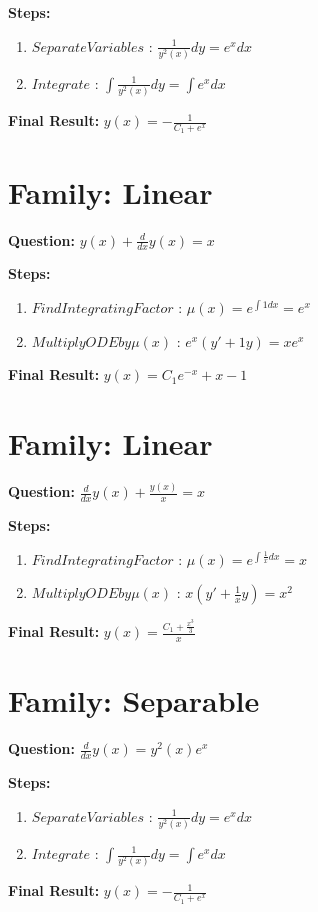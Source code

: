 \documentclass{article}
\begin{document}
\textbf{Steps:}
\begin{enumerate}
\item $Separate Variables$ :  $\frac{1}{y^{2}{\left(x \right)}} dy = e^{x} dx$
\item $Integrate$ :  $\int \frac{1}{y^{2}{\left(x \right)}} dy = \int e^{x} dx$
\end{enumerate}
\textbf{Final Result:} $y{\left(x \right)} = - \frac{1}{C_{1} + e^{x}}$

\section*{Family: Linear}
\textbf{Question:} $y{\left(x \right)} + \frac{d}{d x} y{\left(x \right)} = x$

\textbf{Steps:}
\begin{enumerate}
\item $Find Integrating Factor$ :  $\mu(x) = e^{\int 1 dx} = e^{x}$
\item $Multiply ODE by \mu(x)$ :  $e^{x}(y' + 1y) = x e^{x}$
\end{enumerate}
\textbf{Final Result:} $y{\left(x \right)} = C_{1} e^{- x} + x - 1$

\section*{Family: Linear}
\textbf{Question:} $\frac{d}{d x} y{\left(x \right)} + \frac{y{\left(x \right)}}{x} = x$

\textbf{Steps:}
\begin{enumerate}
\item $Find Integrating Factor$ :  $\mu(x) = e^{\int \frac{1}{x} dx} = x$
\item $Multiply ODE by \mu(x)$ :  $x(y' + \frac{1}{x}y) = x^{2}$
\end{enumerate}
\textbf{Final Result:} $y{\left(x \right)} = \frac{C_{1} + \frac{x^{3}}{3}}{x}$

\section*{Family: Separable}
\textbf{Question:} $\frac{d}{d x} y{\left(x \right)} = y^{2}{\left(x \right)} e^{x}$

\textbf{Steps:}
\begin{enumerate}
\item $Separate Variables$ :  $\frac{1}{y^{2}{\left(x \right)}} dy = e^{x} dx$
\item $Integrate$ :  $\int \frac{1}{y^{2}{\left(x \right)}} dy = \int e^{x} dx$
\end{enumerate}
\textbf{Final Result:} $y{\left(x \right)} = - \frac{1}{C_{1} + e^{x}}$
\end{document}
